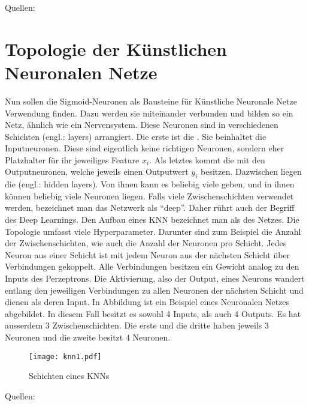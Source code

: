 \para{}
Quellen: \cite{wiki:kuenstliches_neuron} \cite{wiki:sigmoidfunktion} \cite{book:hands-on}


\section{Topologie der Künstlichen Neuronalen Netze}
Nun sollen die Sigmoid-Neuronen als Bausteine für Künstliche
Neuronale Netze Verwendung finden. Dazu werden sie miteinander verbunden und bilden so ein Netz,
ähnlich wie ein Nervensystem.
\para{}
Diese Neuronen sind in verschiedenen Schichten (engl.: layers)
arrangiert. Die erste ist die . Sie beinhaltet die
Inputneuronen. Diese sind eigentlich keine richtigen
Neuronen, sondern eher Platzhalter für ihr jeweiliges Feature $x_i$. Als letztes kommt die
 mit den Outputneuronen, welche jeweils einen Outputwert $y_i$
besitzen. Dazwischen liegen die  (engl.: hidden layers). Von ihnen kann es
beliebig viele geben, und in ihnen können beliebig viele Neuronen liegen.
Falls viele Zwischenschichten verwendet werden, bezeichnet man das Netzwerk als
``deep''. Daher rührt auch der Begriff des Deep Learnings.
Den Aufbau eines KNN bezeichnet man als  des Netzes. Die
Topologie umfasst viele Hyperparameter. Darunter sind zum Beispiel die Anzahl
der Zwischenschichten, wie auch
die Anzahl der Neuronen pro Schicht.
\para{}
Jedes Neuron aus einer Schicht ist mit jedem Neuron aus der nächsten Schicht über
Verbindungen gekoppelt. Alle Verbindungen besitzen ein Gewicht analog zu den Inputs des
Perzeptrons. Die Aktivierung, also der Output, eines Neurons wandert entlang den jeweiligen
Verbindungen zu allen Neuronen der nächsten Schicht und dienen als deren Input.
\para{}
In Abbildung  ist ein Beispiel eines Neuronalen Netzes
abgebildet. In diesem Fall besitzt es sowohl 4 Inputs, als auch 4 Outputs. Es hat
ausserdem 3 Zwischenschichten. Die erste und die dritte haben jeweils 3 Neuronen
und die zweite besitzt 4 Neuronen. \\

\begin{figure}[h!]
  \centering
  \texttt{[image: knn1.pdf]}
  \caption{Schichten eines KNNs}
  \label{fig:nn_layers}
\end{figure}

\para{}
Quellen: \cite{wiki:kuenstliches_neuronales_netz} \cite{Nielsen} \cite{book:hands-on}


